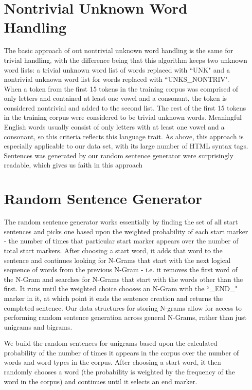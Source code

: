\documentclass[12pt]{article}
\begin{document}
\section{Nontrivial Unknown Word Handling}

The basic approach of out nontrivial unknown word handling is the same for trivial handling, with the difference being that this algorithm keeps two unknown word lists: a trivial unknown word list of words replaced with ``UNK" and a nontrivial unknown word list for words replaced with ``UNKS\_NONTRIV". When a token from the first 15 tokens in the training corpus was comprised of only letters and contained at least one vowel and a consonant, the token is considered nontrivial and added to the second list. The rest of the first 15 tokens in the training corpus were considered to be trivial unknown words. Meaningful English words usually consist of only letters with at least one vowel and a consonant, so this criteria reflects this language trait. As above, this approach is especially applicable to our data set, with its large number of HTML syntax tags. Sentences was generated by our random sentence generator were surprisingly readable, which gives us faith in this approach

\section{Random Sentence Generator}
The random sentence generator works essentially by finding the set of all start sentences and picks one based upon the weighted probability of each start marker - the number of times that particular start marker appears over the number of total start markers. After choosing a start word, it adds that word to the sentence and continues looking for N-Grams that start with the next logical sequence of words from the previous N-Gram - i.e. it removes the first word of the N-Gram and searches for N-Grams that start with the words other than the first. It runs until the weighted choice chooses an N-Gram with the ``\_END\_" marker in it, at which point it ends the sentence creation and returns the completed sentence. Our data structures for storing N-grams allow for access to performing random sentence generation across general N-Grams, rather than just unigrams and bigrams.  

We build the random sentences for unigrams based upon the calculated probability of the number of times it appears in the corpus over the number of words and word types in the corpus. After choosing a start word, it then randomly chooses a word (the probability is weighted by the frequency of the word in the corpus) and continues until it selects an end marker.
\end{document}
